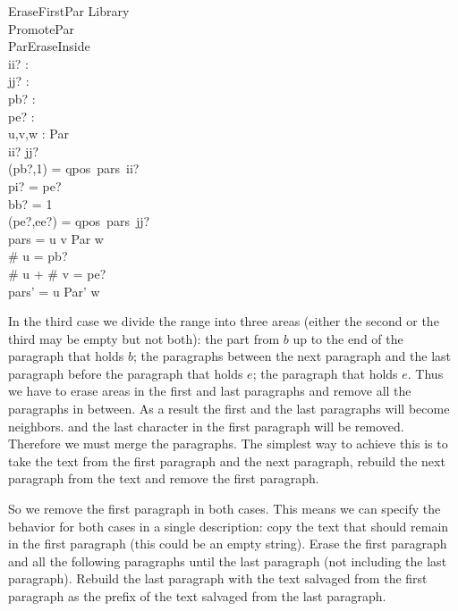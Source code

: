 \documentclass{article}
\begin{document}
\begin{schema}{EraseFirstPar}
	\Delta Library \\
	PromotePar \\
	ParEraseInside \\
	ii? : \nat \\
	jj? : \nat \\
	pb? : \nat \\
	pe? : \nat \\
	u,v,w : \seq Par \\
	\where
	ii? \leq jj? \\
	(pb?,1) = qpos~pars~ii? \\
	pi? = pe? \\
	bb? = 1 \\
	(pe?,ee?) = qpos~pars~jj? \\
	pars = u \cat v \cat \langle \theta Par \rangle \cat w \\
	\# u = pb? \\
	\# u + \# v = pe? \\
	pars' = u \cat \langle \theta Par' \rangle \cat w 
\end{schema}

In the third case we divide the range into three areas (either the second or the third may be empty but not both): the part from $b$ up to the end of the paragraph that holds $b$; the paragraphs between the next paragraph and the last paragraph before the paragraph that holds $e$; the paragraph that holds $e$. Thus we have to erase areas in the first and last paragraphs and remove all the paragraphs in between. As a result the first and the last paragraphs will become neighbors. and the last character in the first paragraph will be removed. Therefore we must merge the paragraphs. The simplest way to achieve this is to take the text from the first paragraph and the next paragraph, rebuild the next paragraph from the text and remove the first paragraph. 

So we remove the first paragraph in both cases. This means we can specify the behavior for both cases in a single description: copy the text that should remain in the first paragraph (this could be an empty string). Erase the first paragraph and all the following paragraphs until the last paragraph (not including the last paragraph). Rebuild the last paragraph with the text salvaged from the first paragraph as the prefix of the text salvaged from the last paragraph.
\end{document}
